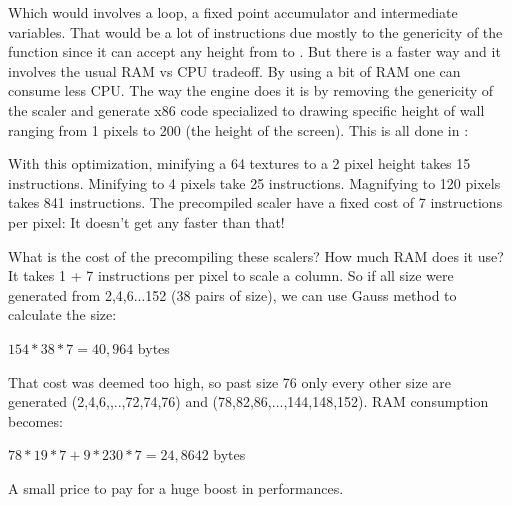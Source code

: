 \par
\begin{minipage}{\textwidth}

\end{minipage}

\par
Which would involves a loop, a fixed point accumulator and intermediate variables. That would be a lot of instructions due mostly to the genericity of the function since it can accept any height from  to . But there is a faster way and it involves the usual RAM vs CPU tradeoff. By using a bit of RAM one can consume less CPU. The way the engine does it is by removing the genericity of the scaler and generate x86 code specialized to drawing specific height of wall ranging from 1 pixels to 200 (the height of the screen). This is all done in :\\
\par
\begin{minipage}{\textwidth}

\end{minipage}
\par
With this optimization, minifying a 64 textures to a 2 pixel height takes 15 instructions. Minifying to 4 pixels take 25 instructions. Magnifying to 120 pixels takes 841 instructions. The precompiled scaler have a fixed cost of 7 instructions per pixel: It doesn't get any faster than that!\\
\par
What is the cost of the precompiling these scalers? How much RAM does it use? It takes 1 + 7 instructions per pixel to scale a column. So if all size were generated from 2,4,6...152 (38 pairs of size), we can use Gauss method to calculate the size:\\
\par
$154*38*7=40,964$ bytes\\
\par
That cost was deemed too high, so past size 76 only every other size are generated (2,4,6,,..,72,74,76) and (78,82,86,...,144,148,152). RAM consumption becomes:\\
\par
$78*19*7+9*230*7=24,8642$ bytes\\
\par
A small price to pay for a huge boost in performances.










